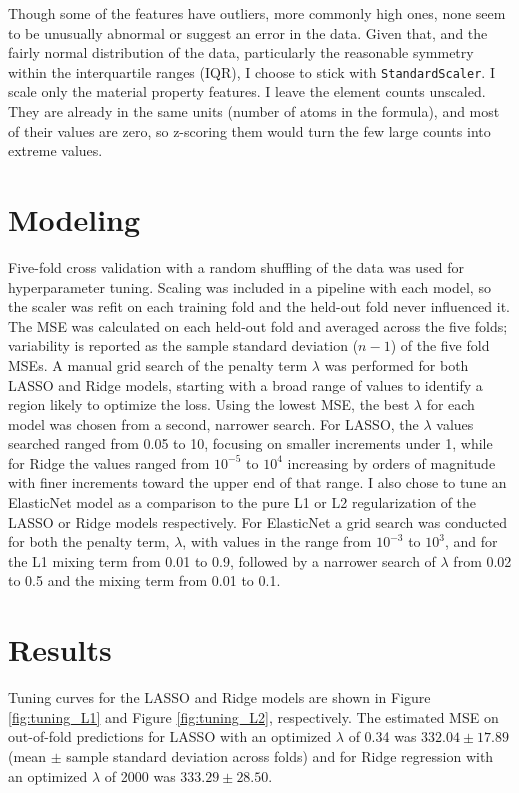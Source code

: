\documentclass{article}
\begin{document}
Though some of the features have outliers, more commonly high ones, none seem to be unusually abnormal or suggest an error in the data. Given that, and the fairly normal distribution of the data, particularly the reasonable symmetry within the interquartile ranges (IQR), I choose to stick with \texttt{StandardScaler}. I scale only the material property features. I leave the element counts unscaled. They are already in the same units (number of atoms in the formula), and most of their values are zero, so z-scoring them would turn the few large counts into extreme values.

\section{Modeling}
Five-fold cross validation with a random shuffling of the data was used for hyperparameter tuning. Scaling was included in a pipeline with each model, so the scaler was refit on each training fold and the held-out fold never influenced it. The MSE was calculated on each held-out fold and averaged across the five folds; variability is reported as the sample standard deviation (\(n-1\)) of the five fold MSEs. A manual grid search of the penalty term \(\lambda \) was performed for both LASSO and Ridge models, starting with a broad range of values to identify a region likely to optimize the loss. Using the lowest MSE, the best \(\lambda \) for each model was chosen from a second, narrower search. For LASSO, the \(\lambda \) values searched ranged from 0.05 to 10, focusing on smaller increments under 1, while for Ridge the values ranged from \(10^{-5}\) to \(10^{4}\) increasing by orders of magnitude with finer increments toward the upper end of that range.
I also chose to tune an ElasticNet model as a comparison to the pure L1 or L2 regularization of the LASSO or Ridge models respectively. For ElasticNet a grid search was conducted for both the penalty term, \(\lambda \), with values in the range from  \(10^{-3}\) to \(10^{3}\), and for the L1 mixing term from 0.01 to 0.9, followed by a narrower search of \(\lambda\) from 0.02 to 0.5 and the mixing term from 0.01 to 0.1.

\section{Results}

Tuning curves for the LASSO and Ridge models are shown in Figure \ref{fig:tuning_L1} and Figure \ref{fig:tuning_L2}, respectively. The estimated MSE on out-of-fold predictions for LASSO with an optimized \(\lambda \) of 0.34 was \( 332.04 \pm 17.89 \) (mean \(\pm\) sample standard deviation across folds) and for Ridge regression with an optimized \(\lambda \) of 2000 was \( 333.29 \pm 28.50 \). 
\end{document}

